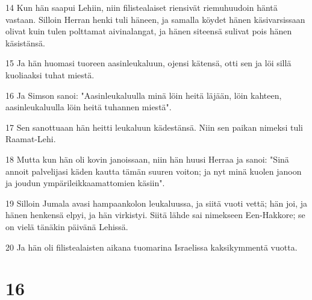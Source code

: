 \par 14 Kun hän saapui Lehiin, niin filistealaiset riensivät riemuhuudoin häntä vastaan. Silloin Herran henki tuli häneen, ja samalla köydet hänen käsivarsissaan olivat kuin tulen polttamat aivinalangat, ja hänen siteensä sulivat pois hänen käsistänsä.
\par 15 Ja hän huomasi tuoreen aasinleukaluun, ojensi kätensä, otti sen ja löi sillä kuoliaaksi tuhat miestä.
\par 16 Ja Simson sanoi: "Aasinleukaluulla minä löin heitä läjään, löin kahteen, aasinleukaluulla löin heitä tuhannen miestä".
\par 17 Sen sanottuaan hän heitti leukaluun kädestänsä. Niin sen paikan nimeksi tuli Raamat-Lehi.
\par 18 Mutta kun hän oli kovin janoissaan, niin hän huusi Herraa ja sanoi: "Sinä annoit palvelijasi käden kautta tämän suuren voiton; ja nyt minä kuolen janoon ja joudun ympärileikkaamattomien käsiin".
\par 19 Silloin Jumala avasi hampaankolon leukaluussa, ja siitä vuoti vettä; hän joi, ja hänen henkensä elpyi, ja hän virkistyi. Siitä lähde sai nimekseen Een-Hakkore; se on vielä tänäkin päivänä Lehissä.
\par 20 Ja hän oli filistealaisten aikana tuomarina Israelissa kaksikymmentä vuotta.

\chapter{16}

